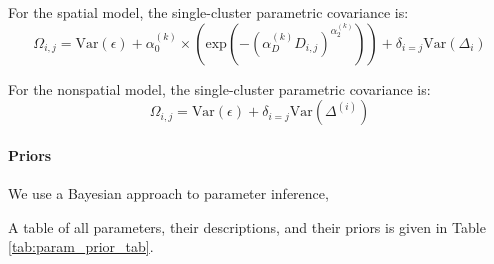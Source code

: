 \documentclass[12pt]{article}
\begin{document}
For the spatial model, the single-cluster parametric covariance is:
\begin{equation}
\Omega_{i,j} = \text{Var}(\epsilon) + 
\alpha^{(k)}_0 \times \left(\text{exp} \left(  -(\alpha^{(k)}_D D_{i,j})^{\alpha^{(k)}_2}\right) \right)	 +
\delta_{i=j} \text{Var}(\Delta_i)
\label{admixed_continuous_cov}
\end{equation}

For the nonspatial model, the single-cluster parametric covariance is:
\begin{equation}
\Omega_{i,j} = \text{Var}(\epsilon) + \delta_{i=j} \text{Var}(\Delta^{(i)})
\label{admixed_discrete_covariance}
\end{equation}

\paragraph{Priors}
We use a Bayesian approach to parameter inference, 

A table of all parameters, their descriptions, and their priors is given in Table \ref{tab:param_prior_tab}.
\end{document}
